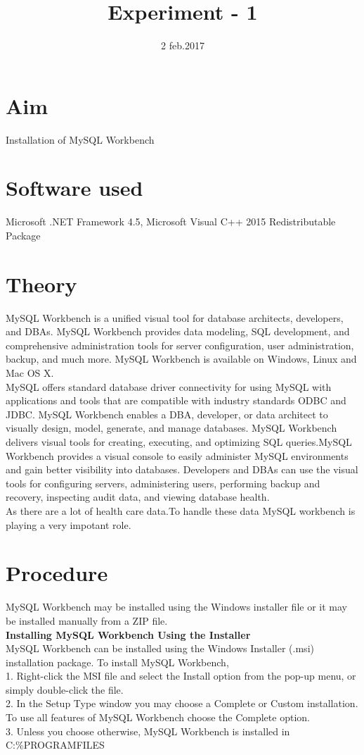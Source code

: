 \documentclass[50pt]{article}
\title{Experiment - 1} %
\date{2 feb.2017} %
\begin{document}
		\maketitle %
	\section{Aim}
     Installation of MySQL Workbench
	\section{Software used}
	Microsoft .NET Framework 4.5, Microsoft Visual C++ 2015 Redistributable Package
	\section{Theory}
	MySQL Workbench is a unified visual tool for database architects, developers, and DBAs. MySQL Workbench provides data modeling, SQL development, and comprehensive administration tools for server configuration, user administration, backup, and much more. MySQL Workbench is available on Windows, Linux and Mac OS X.\\
    MySQL offers standard database driver connectivity for using MySQL with applications and tools that are compatible with industry standards ODBC and JDBC.	MySQL Workbench enables a DBA, developer, or data architect to visually design, model, generate, and manage databases.	MySQL Workbench delivers visual tools for creating, executing, and optimizing SQL queries.MySQL Workbench provides a visual console to easily administer MySQL environments and gain better visibility into databases. Developers and DBAs can use the visual tools for configuring servers, administering users, performing backup and recovery, inspecting audit data, and viewing database health.\\
	As there are a lot of health care data.To handle these data MySQL workbench is playing a very impotant role.
    \section{Procedure}
    MySQL Workbench may be installed using the Windows installer file or it may be installed manually from a ZIP file.\\
    \newpage
   \textbf{ Installing MySQL Workbench Using the Installer}\\
    MySQL Workbench can be installed using the Windows Installer (.msi) installation package. To install MySQL Workbench,\\
    1. Right-click the MSI file and select the Install option from the pop-up menu, or simply double-click the file.\\
    2. In the Setup Type window you may choose a Complete or Custom installation. To use all features of MySQL Workbench choose the Complete option.\\
    3. Unless you choose otherwise, MySQL Workbench is installed in C:\%PROGRAMFILES%
    
\end{document}
